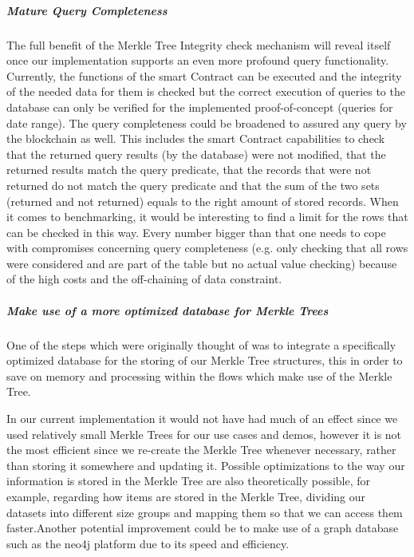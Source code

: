 \subparagraph{Mature Query Completeness}
The full benefit of the Merkle Tree Integrity check mechanism will reveal itself once our implementation supports an even more profound query functionality. Currently, the functions of the smart Contract can be executed and the integrity of the needed data for them is checked but the correct execution of queries to the database can only be verified for the implemented proof-of-concept (queries for date range). The query completeness could be broadened to assured any query by the blockchain as well. This includes the smart Contract capabilities to check that the returned query results (by the database) were not modified, that the returned results match the query predicate, that the records that were not returned do not match the query predicate and that the sum of the two sets (returned and not returned) equals to the right amount of stored records.
When it comes to benchmarking, it would be interesting to find a limit for the rows that can be checked in this way. Every number bigger than that one needs to cope with compromises concerning query completeness (e.g. only checking that all rows were considered and are part of the table but no actual value checking) because of the high costs and the off-chaining of data constraint.

\subparagraph{Make use of a more optimized database for Merkle Trees}
One of the steps which were originally thought of was to integrate a specifically optimized database for the storing of our Merkle Tree structures, this in order to save on memory and processing within the flows which make use of the Merkle Tree.

In our current implementation it would not have had much of an effect since we used relatively small Merkle Trees for our use cases and demos, however it is not the most efficient since we re-create the Merkle Tree whenever necessary, rather than storing it somewhere and updating it.
Possible optimizations to the way our information is stored in the Merkle Tree are also theoretically possible, for example, regarding how items are stored in the Merkle Tree, dividing our datasets into different size groups and mapping them so that we can access them faster.Another potential improvement could be to make use of a graph database such as the neo4j platform due to its speed and efficiency.


